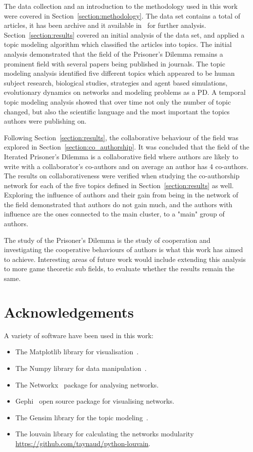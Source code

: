 \documentclass{article}
\theoremstyle{definition}
\newcommand{\totalarticles}{}
\begin{document}
The data collection and an introduction to the methodology used in this work
were covered in Section~\ref{section:methodology}.
The data set contains a total of \totalarticles articles, it has been archive
and it available in~\cite{pd_data_2018} for further analysis.
Section~\ref{section:results} covered an initial analysis of the data set,
and applied a topic modeling algorithm which classified the articles into
topics. The initial analysis demonstrated that the field of the Prisoner's
Dilemma remains a prominent field with several papers being published in journals.
The topic modeling analysis identified five different topics which appeared
to be human subject research, biological studies, strategies and agent based simulations,
evolutionary dynamics on networks and modeling problems as a PD.
A temporal topic modeling analysis showed that over time not only
the number of topic changed, but also the scientific language and the most important
the topics authors were publishing on.

Following Section~\ref{section:results}, the collaborative behaviour of the field was explored
in Section~\ref{section:co_authorship}. It was concluded that the field
of the Iterated Prisoner's Dilemma is a collaborative field where authors
are likely to write with a collaborator's co-authors and on average an author
has 4 co-authors. The results on collaborativeness were verified when studying
the co-authorship network for each of the five topics defined in Section~\ref{section:results}
as well. Exploring the influence of authors and their gain from being in the
network of the field demonstrated that authors do not gain much, and the authors
with influence are the ones connected to the main cluster, to a "main" group of authors.

The study of the Prisoner's Dilemma is the study of cooperation and investigating
the cooperative behaviours of authors is what this work has aimed to achieve.
Interesting areas of future work would include extending this analysis to more
game theoretic sub fields, to evaluate whether the results remain the same.

\section{Acknowledgements}

A variety of software have been used in this work:

\begin{itemize}
    \item The Matplotlib library for visualisation~\cite{hunter2007matplotlib}.
    \item The Numpy library for data manipulation~\cite{walt2011numpy}.
    \item The Networkx~\cite{networkx} package for analysing networks.
    \item Gephi~\cite{ICWSM09154} open source package for visualising networks.
    \item The Gensim library for the topic modeling~\cite{rehurek_lrec}.
    \item The louvain library for calculating the networks modularity \url{https://github.com/taynaud/python-louvain}.
\end{itemize}
\end{document}

